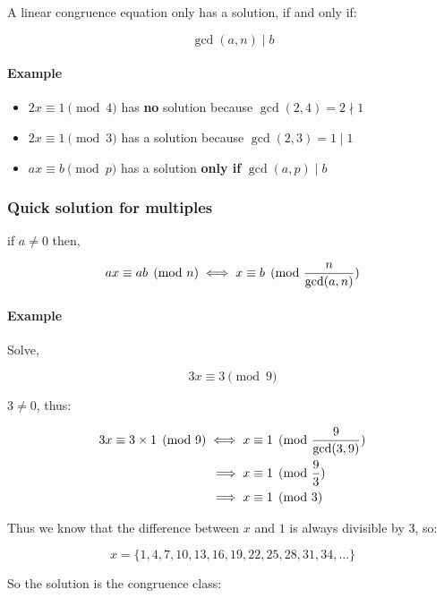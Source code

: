 \documentclass[
]{article}
\begin{document}
A linear congruence equation only has a solution, if and only if:

\[\gcd(a,n) \mid b\]

\hypertarget{header-n534}{%
\paragraph{Example}\label{header-n534}}

\begin{itemize}
\item
  \(2x \equiv 1 \pmod{4}\) has \textbf{no} solution because
  \(\gcd(2,4) = 2 \nmid 1\)
\item
  \(2x \equiv 1 \pmod{3}\) has a solution because
  \(\gcd(2,3) = 1 \mid 1\)
\item
  \(ax \equiv b \pmod{p}\) has a solution \textbf{only if}
  \(\gcd(a,p) \mid b\) 
\end{itemize}

\hypertarget{header-n542}{%
\subsubsection{Quick solution for multiples}\label{header-n542}}

if \(a \neq 0\) then,

\[ax \equiv ab \pmod{n} \iff x \equiv b \pmod{\small\frac{n}{\gcd(a,n)}}\]

\hypertarget{header-n545}{%
\paragraph{Example}\label{header-n545}}

Solve,

\[3x \equiv 3 \pmod{9}\]

\(3 \neq 0\), thus:

\begin{align}
3x \equiv 3 \times 1 \pmod{9} \iff x &\equiv 1 \pmod{ \small{\frac{9}{\gcd(3,9)}} }\\
\implies x &\equiv 1 \pmod{\small {\frac{9}{3}}}\\
\implies x & \equiv 1 \pmod{3}
\end{align}

Thus we know that the difference between \(x\) and \(1\) is always
divisible by \(3\), so:

\[x = \{1, 4, 7, 10, 13, 16, 19, 22, 25, 28, 31, 34, \dots\}\]

So the solution is the congruence class:
\end{document}
